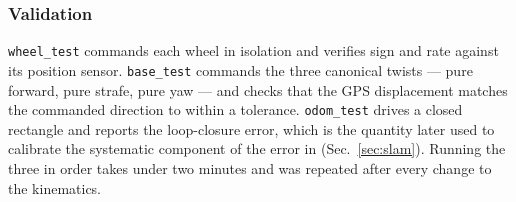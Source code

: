 

\subsubsection{Validation}

\texttt{wheel\_test} commands each wheel in isolation and verifies sign
and rate against its position sensor. \texttt{base\_test} commands the
three canonical twists --- pure forward, pure strafe, pure yaw --- and
checks that the GPS displacement matches the commanded direction to
within a tolerance. \texttt{odom\_test} drives a closed rectangle and
reports the loop-closure error, which is the quantity later used to
calibrate the systematic component of the error in \phaseB{}
(Sec.~\ref{sec:slam}). Running the three in order takes under two
minutes and was repeated after every change to the kinematics.
